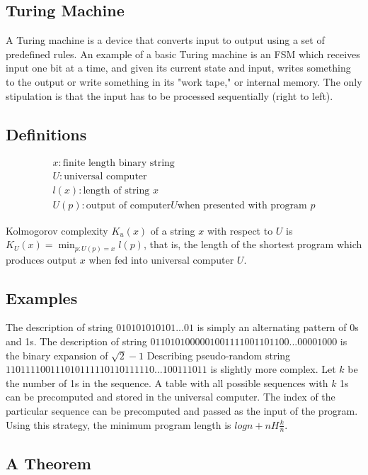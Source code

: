 \documentclass[11pt]{article}
\theoremstyle{definition}
\begin{document}
\subsection{Turing Machine}

A Turing machine is a device that converts input to output using a set of predefined rules. An example of a basic Turing machine is an FSM which receives input one bit at a time, and given its current state and input, writes something to the output or write something in its "work tape," or internal memory. The only stipulation is that the input has to be processed sequentially (right to left). 

\subsection{Definitions}

\begin{align*}
	x: \text{finite length binary string} \\
	U: \text{universal computer} \\
	l(x): \text{length of string } x \\
	U(p): \text{output of computer} U \text{when presented with program } p 
\end{align*}

 Kolmogorov complexity $K_u(x)$ of a string $x$ with respect to $U$ is $K_U(x) = \min_{p: U(p)=x} l(p)$, that is, the length of the shortest program which produces output $x$ when fed into universal computer $U$.

\subsection{Examples}

\example The description of string $010101010101...01$ is simply an alternating pattern of 0s and 1s.
\example The description of string $0110101000001001111001101100...00001000$ is the binary expansion of $\sqrt{2}-1$
\example Describing pseudo-random string $110111100111010111110110111110...100111011$ is slightly more complex. Let $k$ be the number of 1s in the sequence. A table with all possible sequences with $k$ 1s can be precomputed and stored in the universal computer. The index of the particular sequence can be precomputed and passed as the input of the program. Using this strategy, the minimum program length is $log n + n H\frac{k}{n}$.

\subsection{A Theorem}
\end{document}
